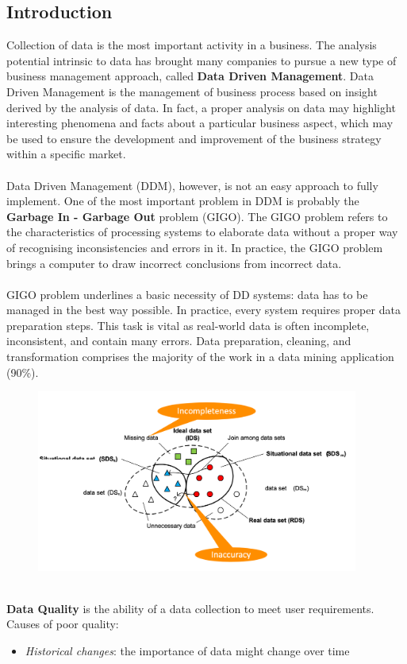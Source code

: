 \documentclass[10pt,a4paper]{article}
\newcommand{\nline}{\\~\\}
\begin{document}
\begin{justify}
\subsection{Introduction}
Collection of data is the most important activity in a business. The analysis potential intrinsic to data has brought many companies to pursue a new type of business management approach, called \textbf{Data Driven Management}. Data Driven Management is the management of business process based on insight derived by the analysis of data. In fact, a proper analysis on data may highlight interesting phenomena and facts about a particular business aspect, which may be used to ensure the development and improvement of the business strategy within a specific market.\nline 
Data Driven Management (DDM), however, is not an easy approach to fully implement. One of the most important problem in DDM is probably the \textbf{Garbage In - Garbage Out} problem (GIGO). The GIGO problem refers to the characteristics of processing systems to elaborate data without a proper way of recognising inconsistencies and errors in it. In practice, the GIGO problem brings a computer to draw incorrect conclusions from incorrect data. \nline
GIGO problem underlines a basic necessity of DD systems: data has to be managed in the best way possible. In practice, every system requires proper data preparation steps. This task is vital as real-world data is often incomplete, inconsistent, and contain many errors. Data preparation, cleaning, and transformation comprises the majority of the work in a data mining application (90\%).
\begin{figure}[htp]
\centering
\includegraphics[width=300pt]{images/data-quality-integration}\hfill
\end{figure} \\
\textbf{Data Quality} is the ability of a data collection to meet user requirements. 
Causes of poor quality:
\begin{itemize}
	\item \textit{Historical changes}: the importance of data might change over time

\end{itemize}
\end{justify}
\end{document}
